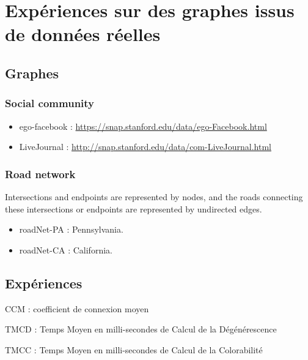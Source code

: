 \newpage

\section{Expériences sur des graphes issus de données réelles }


\subsection{Graphes }
\subsubsection{Social community}
\begin{itemize}
    \item ego-facebook :
    \href{https://snap.stanford.edu/data/ego-Facebook.html
    }{https://snap.stanford.edu/data/ego-Facebook.html
    }
    \item LiveJournal :
    \href{http://snap.stanford.edu/data/com-LiveJournal.html}{http://snap.stanford.edu/data/com-LiveJournal.html
    }

\end{itemize}

\subsubsection{Road network}
Intersections and endpoints are represented by nodes, and the roads connecting these intersections or endpoints are represented by undirected edges.

\begin{itemize}
    \item roadNet-PA : Pennsylvania.
    \item roadNet-CA : California.
\end{itemize}


\subsection{Expériences }
CCM : coefficient de connexion moyen

TMCD : Temps Moyen en milli-secondes de Calcul  de la Dégénérescence

TMCC : Temps Moyen en milli-secondes de Calcul  de la Colorabilité

